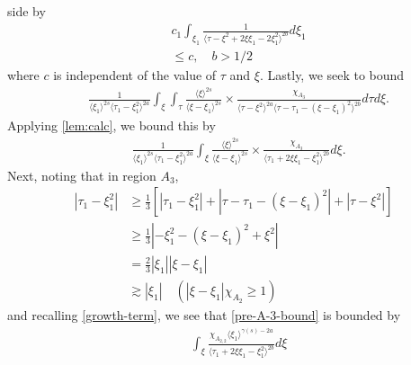 \documentclass[12pt,reqno]{amsart}
\numberwithin{equation}{section}  %
\begin{document}
side by
%
%
\begin{equation*}
\begin{split}
  & c_{1} \int_{\xi_{1}}  \frac{1}{\langle \tau - \xi^{2} + 2 \xi \xi_{1} - 2
  \xi_{1}^{2} \rangle^{2b} }d \xi_{1}
  \\
  & \le  c, \quad b > 1/2
\end{split}
\end{equation*}
%
%
where $c$ is independent of the value of $\tau$ and $\xi$. 
%
Lastly, we seek to bound
\begin{equation*}
\begin{split}
  &  \frac{1}{\langle \xi_{1} \rangle ^{2s}
  \langle \tau_{1} - \xi_{1}^{2}  \rangle
  ^{2a}} \int_{\xi} \int_{\tau} \frac{\langle \xi \rangle ^{2s}}{\langle
  \xi - \xi_{1}\rangle ^{2s}}  \times \frac{\chi_{A_{3}}}{\langle
  \tau - \xi^{2} \rangle ^{2a} \langle \tau - \tau_{1} - (\xi -
  \xi_{1})^{2} \rangle^{2b} } d \tau d \xi.
\end{split}
\end{equation*}
Applying \cref{lem:calc}, we bound this by
%
%
\begin{equation}
  \label{pre-A-3-bound}
\begin{split}
  &  \frac{1}{\langle \xi_{1} \rangle ^{2s}
  \langle \tau_{1} - \xi_{1}^{2}  \rangle
  ^{2a}} \int_{\xi} \frac{\langle \xi \rangle ^{2s}}{\langle
  \xi - \xi_{1}\rangle ^{2s}}  \times \frac{\chi_{A_{3}}}{\langle
  \tau_{1} + 2 \xi \xi_{1} - \xi_{1}^{2} \rangle^{2b} } d \xi.
\end{split}
\end{equation}
%
Next, noting that in region $A_{3}$,
%
%
\begin{equation*}
\begin{split}
  | \tau_{1} -\xi_{1}^{2} |
  & \ge \frac{1}{3} \left[ | \tau_{1} - \xi_{1}^{2} | + | \tau - \tau_{1} -
  (\xi - \xi_{1})^{2} | + | \tau - \xi^{2} | \right]
  \\
  & \ge \frac{1}{3} | - \xi_{1}^{2} - (\xi - \xi_{1})^{2} + \xi^{2} |
  \\
  & = \frac{2}{3} | \xi_{1} | | \xi - \xi_{1} |
  \\
  & \gtrsim | \xi_{1} | \quad (| \xi - \xi_{1} |\chi_{A_{2}} \ge 1)
\end{split}
\end{equation*}
%
%
and recalling \eqref{growth-term}, we see that \eqref{pre-A-3-bound} is bounded by
\begin{equation*}
\begin{split}
  &  \int_{\xi} \frac{\chi_{A_{2,2}} \langle \xi_{1} \rangle ^{\gamma(s) -2a}}{\langle
  \tau_{1} + 2 \xi \xi_{1} - \xi_{1}^{2} \rangle^{2b} } d \xi
\end{split}
\end{equation*}
\end{document}
